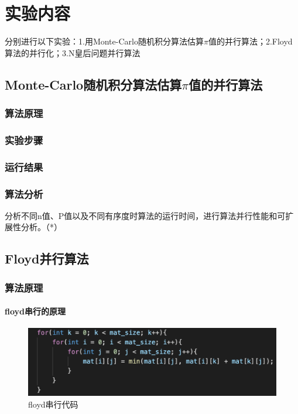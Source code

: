 \documentclass[10pt]{article}
\begin{document}
\section{实验内容}
分别进行以下实验：1.用Monte-Carlo随机积分算法估算$\pi$值的并行算法；2.Floyd算法的并行化；3.N皇后问题并行算法

\subsection{Monte-Carlo随机积分算法估算$\pi$值的并行算法}

\subsubsection{算法原理}



\subsubsection{实验步骤}

\subsubsection{运行结果}

\subsubsection{算法分析}
分析不同n值、P值以及不同有序度时算法的运行时间，进行算法并行性能和可扩展性分析。（*）

\subsection{Floyd并行算法}

\subsubsection{算法原理}

\paragraph{floyd串行的原理}

\begin{figure}[htbp]
    \centering
    \includegraphics[width=.6\textwidth]{assets/floyd串行.png}
    \caption{floyd串行代码}
    \label{floyd串行代码}
\end{figure}
\end{document}
